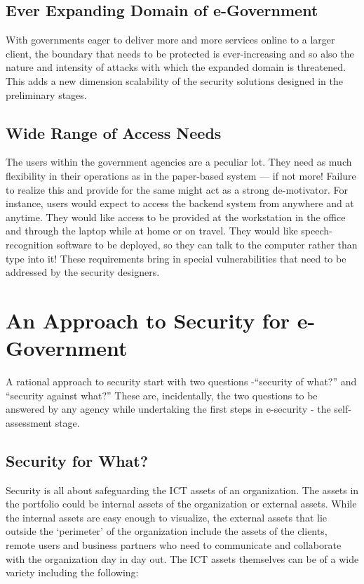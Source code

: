   
 \subsection{Ever Expanding Domain of e-Government}
 With governments eager to deliver more and more services online to a larger client, the boundary that needs to be protected is ever-increasing and so also the nature and intensity  of attacks with which  the expanded domain is threatened. This adds a new dimension scalability of the security solutions designed in the preliminary stages.
 
 \subsection{Wide Range of Access Needs}
 The users within the government agencies are a peculiar lot. They need as much flexibility in their operations as in the paper-based system — if not more! Failure to realize this and provide for the same might act as a strong de-motivator. For instance, users would expect to access the backend system from anywhere and at anytime. They would like access to be provided at the workstation in the office and through the laptop while at home or on travel. They would like speech-recognition software to be deployed, so they can talk to the computer rather than type into it! These requirements bring in special vulnerabilities that need to be addressed by the security designers.
 
 
 
 \section{An Approach to Security for e-Government}
 A rational approach to security start with two questions -``security of what?'' and ``security against what?'' These are, incidentally, the two questions to be answered by any agency while undertaking the first steps in e-security - the self-assessment stage.
 
 \subsection{Security for What?}
 Security is all about safeguarding the ICT assets of an organization. The assets in the portfolio could be internal assets of the organization or external assets. While the internal assets are easy enough to visualize, the external assets that lie outside the `perimeter' of the organization include the assets of the clients, remote users and business partners who need to communicate and collaborate with the organization day in day out. The ICT assets themselves can be of a wide variety including the following:
 
